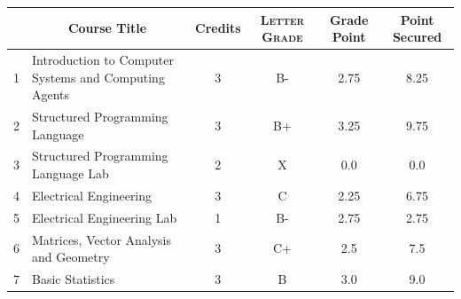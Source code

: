 \documentclass[11pt]{article}
\newcommand*{\numtwo}[1]{\pgfmathprintnumber[
                    fixed, precision=2, fixed zerofill=true]{#1}}
\begin{document}
                \begin{center}
                    \renewcommand{\arraystretch}{1.08}
                    
                \begin{tabular}{|c|l|c|>{\scshape}c|c|c|}
                \hline  \rule[-1ex]{0pt}{3.5ex} {\centering{\bf Course Code}} &  \multicolumn{1}{c|}{\textbf{Course Title}}  & {\bf Credits} & {\bf Letter Grade} & {\bf Grade Point} & {\bf Point Secured}  \\ 
                \hline   1 &  Introduction to Computer Systems and Computing Agents		 & 3 & B- & 2.75 & 8.25 \\ %
                \hline   2 &  Structured Programming Language		 & 3 & B+ & 3.25 & 9.75 \\ %
                \hline   3 &  Structured Programming Language Lab		 & 2 & X & 0.0 & 0.0 \\ %
                \hline   4 &  Electrical Engineering		 & 3 & C & 2.25 & 6.75 \\ %
                \hline   5 &  Electrical Engineering Lab		 & 1 & B- & 2.75 & 2.75 \\ %
                \hline   6 &  Matrices, Vector Analysis and Geometry		 & 3 & C+ & 2.5 & 7.5 \\ %
                \hline   7 &  Basic Statistics		 & 3 & B & 3.0 & 9.0 \\ %

\hline                %
                \end{tabular}
                \end{center}
                \renewcommand{\arraystretch}{1.03}
\end{document}
